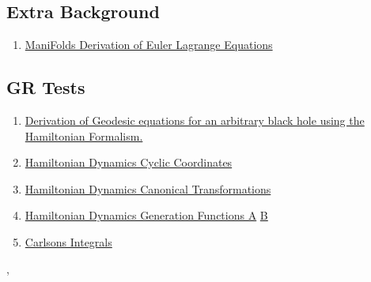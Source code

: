 \documentclass[11pt]{article}
\renewcommand{\today}{\shortmonthname[\the\month] \the \day,  \the\year}
\begin{document}
\vspace{-0.75cm}

\subsection*{\large Extra Background}

\vspace{-0.5cm}

\begin{enumerate}
	\item \href{https://mp.weixin.qq.com/s/NTN14fAOn4r3hHJx2UXnlw}{ManiFolds Derivation of Euler Lagrange Equations}	%
\end{enumerate}

\vspace{-0.75cm}

\subsection*{\large GR Tests}

\vspace{-0.5cm}

\begin{enumerate}
	\item \href{https://mp.weixin.qq.com/s/qYWvJqSsgT_kzhbH4PG0aw}{Derivation of Geodesic equations for an arbitrary black hole using the Hamiltonian Formalism.}	%
	\item \href{https://mp.weixin.qq.com/s/XXjtJVpZUkXL-VhMt-ETVg}{Hamiltonian Dynamics Cyclic Coordinates}	%
	\item \href{https://mp.weixin.qq.com/s/7sRlo23q3t2S-Z5C1IUngg}{Hamiltonian Dynamics Canonical Transformations}	%
	\item \href{https://mp.weixin.qq.com/s/KQiD798xZohSglRWsrA5gg}{Hamiltonian Dynamics Generation Functions A} \quad \href{https://mp.weixin.qq.com/s/lMIv_OG7mxXYqfo0mdeEdg}{B}   %
	\item \href{https://mp.weixin.qq.com/s/VvdqigmCrGb1xymmRwPm5g}{Carlsons Integrals}	%
\end{enumerate}




%
\begin{flushright}
	\tiny \today 
\end{flushright}
\end{document}
